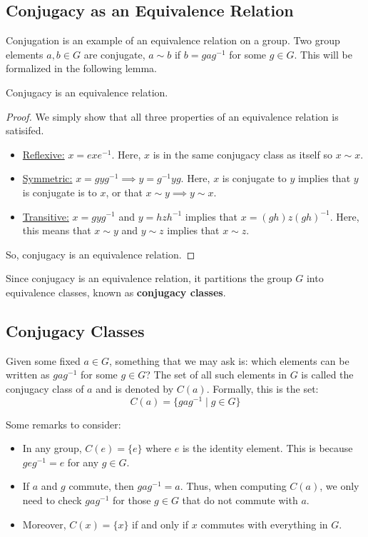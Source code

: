 \documentclass[letterpaper]{article}
\begin{document}
\subsection{Conjugacy as an Equivalence Relation}
Conjugation is an example of an equivalence relation on a group. Two group elements $a, b \in G$ are conjugate, $a \sim b$ if $b = gag^{-1}$ for some $g \in G$. This will be formalized in the following lemma. 
\begin{lemma}{}{}
    Conjugacy is an equivalence relation. 
\end{lemma}

\begin{mdframed}
    \begin{proof}
        We simply show that all three properties of an equivalence relation is satisifed. 
        \begin{itemize}
            \item \underline{Reflexive:} $x = exe^{-1}$. Here, $x$ is in the same conjugacy class as itself so $x \sim x$. 
            \item \underline{Symmetric:} $x = gyg^{-1} \implies y = g^{-1}yg$. Here, $x$ is conjugate to $y$ implies that $y$ is conjugate is to $x$, or that $x \sim y \implies y \sim x$. 
            \item \underline{Transitive:} $x = gyg^{-1}$ and $y = hzh^{-1}$ implies that $x = (gh)z(gh)^{-1}$. Here, this means that $x \sim y$ and $y \sim z$ implies that $x \sim z$. 
        \end{itemize}
        So, conjugacy is an equivalence relation. 
    \end{proof}
\end{mdframed}
Since conjugacy is an equivalence relation, it partitions the group $G$ into equivalence classes, known as \textbf{conjugacy classes}. 

\subsection{Conjugacy Classes}
Given some fixed $a \in G$, something that we may ask is: which elements can be written as $gag^{-1}$ for some $g \in G$? The set of all such elements in $G$ is called the conjugacy class of $a$ and is denoted by $C(a)$. Formally, this is the set: 
\[C(a) = \{gag^{-1} \mid g \in G\}\]

Some remarks to consider:
\begin{itemize}
    \item In any group, $C(e) = \{e\}$ where $e$ is the identity element. This is because $geg^{-1} = e$ for any $g \in G$. 
    \item If $a$ and $g$ commute, then $gag^{-1} = a$. Thus, when computing $C(a)$, we only need to check $gag^{-1}$ for those $g \in G$ that do not commute with $a$.
    \item Moreover, $C(x) = \{x\}$ if and only if $x$ commutes with everything in $G$. 
\end{itemize}
\end{document}
